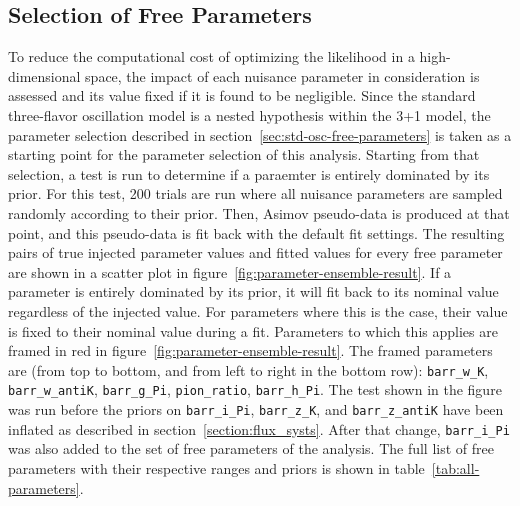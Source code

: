 \subsection{Selection of Free Parameters}
\label{sec:sterile-analysis-parameter-selection}
To reduce the computational cost of optimizing the likelihood in a high-dimensional space, the impact of each nuisance parameter in consideration is assessed and its value fixed if it is found to be negligible. Since the standard three-flavor oscillation model is a nested hypothesis within the 3+1 model, the parameter selection described in section~\ref{sec:std-osc-free-parameters} is taken as a starting point for the parameter selection of this analysis.
Starting from that selection, a test is run to determine if a paraemter is entirely dominated by its prior. For this test, 200 trials are run where all nuisance parameters are sampled randomly according to their prior. Then,  Asimov pseudo-data is produced at that point, and this pseudo-data is fit back with the default fit settings. The resulting pairs of true injected parameter values and fitted values for every free parameter are shown in a scatter plot in figure~\ref{fig:parameter-ensemble-result}. If a parameter is entirely dominated by its prior, it will fit back to its nominal value regardless of the injected value. For parameters where this is the case, their value is fixed to their nominal value during a fit. Parameters to which this applies are framed in red in figure~\ref{fig:parameter-ensemble-result}. The framed parameters are (from top to bottom, and from left to right in the bottom row): \texttt{barr\_w\_K}, \texttt{barr\_w\_antiK}, \texttt{barr\_g\_Pi}, \texttt{pion\_ratio}, \texttt{barr\_h\_Pi}. The test shown in the figure was run before the priors on \texttt{barr\_i\_Pi}, \texttt{barr\_z\_K}, and \texttt{barr\_z\_antiK} have been inflated as described in section~\ref{section:flux_systs}. After that change,  \texttt{barr\_i\_Pi} was also added to the set of free parameters of the analysis. The full list of free parameters with their respective ranges and priors is shown in table~\ref{tab:all-parameters}.

